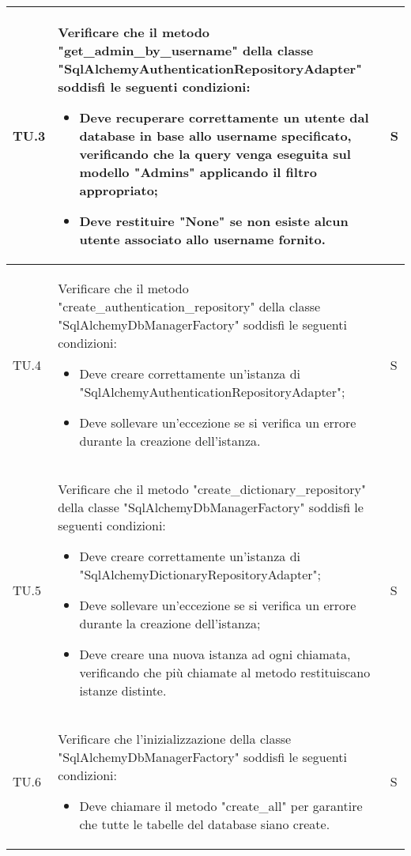 \begin{adjustwidth}{-0.5cm}{-0.5cm}
\begin{longtable}{|P{1.5cm}|>{\raggedright}P{9.5cm}|>{\arraybackslash}P{1.5cm}|}
		\hline TU.3 & Verificare che il metodo "get\_admin\_by\_username" della classe "SqlAlchemyAuthenticationRepositoryAdapter" soddisfi le seguenti condizioni:
		\begin{itemize}
			\item Deve recuperare correttamente un utente dal database in base allo username specificato, verificando che la query venga eseguita sul modello "Admins" applicando il filtro appropriato;
			\item Deve restituire "None" se non esiste alcun utente associato allo username fornito.
		\end{itemize} & S \\

		\hline TU.4 & Verificare che il metodo "create\_authentication\_repository" della classe "SqlAlchemyDbManagerFactory" soddisfi le seguenti condizioni:
		\begin{itemize}
			\item Deve creare correttamente un'istanza di "SqlAlchemyAuthenticationRepositoryAdapter";
			\item Deve sollevare un'eccezione se si verifica un errore durante la creazione dell'istanza.
		\end{itemize} & S \\

		\hline TU.5 & Verificare che il metodo "create\_dictionary\_repository" della classe "SqlAlchemyDbManagerFactory" soddisfi le seguenti condizioni:
		\begin{itemize}
			\item Deve creare correttamente un'istanza di "SqlAlchemyDictionaryRepositoryAdapter";
			\item Deve sollevare un'eccezione se si verifica un errore durante la creazione dell'istanza;
			\item Deve creare una nuova istanza ad ogni chiamata, verificando che più chiamate al metodo restituiscano istanze distinte.
		\end{itemize} & S \\

		\hline TU.6 & Verificare che l'inizializzazione della classe "SqlAlchemyDbManagerFactory" soddisfi le seguenti condizioni:
		\begin{itemize}
			\item Deve chiamare il metodo "create\_all" per garantire che tutte le tabelle del database siano create.
		\end{itemize} & S \\


\end{longtable}
\end{adjustwidth}
